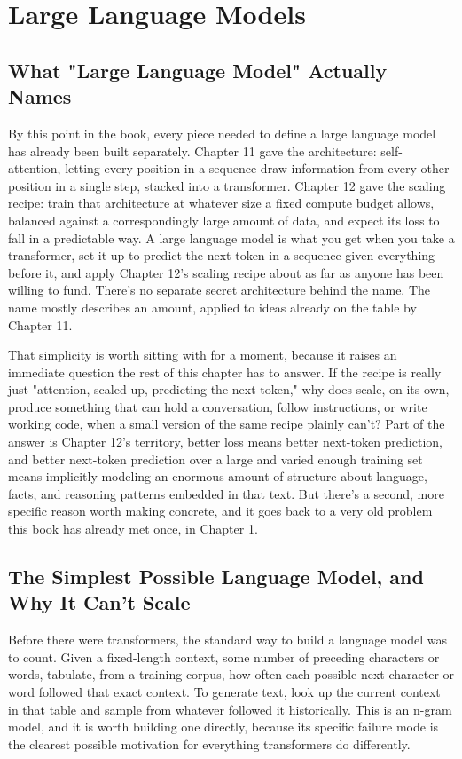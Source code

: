 \chapter{Large Language Models}

\section*{What "Large Language Model" Actually Names}

By this point in the book, every piece needed to define a large language model has already been built separately. Chapter 11 gave the architecture: self-attention, letting every position in a sequence draw information from every other position in a single step, stacked into a transformer. Chapter 12 gave the scaling recipe: train that architecture at whatever size a fixed compute budget allows, balanced against a correspondingly large amount of data, and expect its loss to fall in a predictable way. A large language model is what you get when you take a transformer, set it up to predict the next token in a sequence given everything before it, and apply Chapter 12's scaling recipe about as far as anyone has been willing to fund. There's no separate secret architecture behind the name. The name mostly describes an amount, applied to ideas already on the table by Chapter 11.

That simplicity is worth sitting with for a moment, because it raises an immediate question the rest of this chapter has to answer. If the recipe is really just "attention, scaled up, predicting the next token," why does scale, on its own, produce something that can hold a conversation, follow instructions, or write working code, when a small version of the same recipe plainly can't? Part of the answer is Chapter 12's territory, better loss means better next-token prediction, and better next-token prediction over a large and varied enough training set means implicitly modeling an enormous amount of structure about language, facts, and reasoning patterns embedded in that text. But there's a second, more specific reason worth making concrete, and it goes back to a very old problem this book has already met once, in Chapter 1.

\section*{The Simplest Possible Language Model, and Why It Can't Scale}

Before there were transformers, the standard way to build a language model was to count. Given a fixed-length context, some number of preceding characters or words, tabulate, from a training corpus, how often each possible next character or word followed that exact context. To generate text, look up the current context in that table and sample from whatever followed it historically. This is an n-gram model, and it is worth building one directly, because its specific failure mode is the clearest possible motivation for everything transformers do differently.

